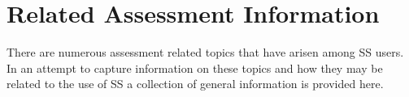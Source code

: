 
\section{Related Assessment Information}

There are numerous assessment related topics that have arisen among SS users.  In an attempt to capture information on these  topics and how they may be related to the use of SS a collection of general information is provided here.





\pagebreak

